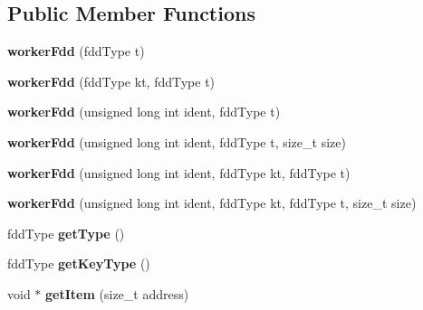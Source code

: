 \subsection*{Public Member Functions}
\begin{DoxyCompactItemize}
\item 
\hypertarget{classfaster_1_1workerFdd_a93ad6099e1b600358729aa45952c6ac9}{}{\bfseries worker\+Fdd} (fdd\+Type t)\label{classfaster_1_1workerFdd_a93ad6099e1b600358729aa45952c6ac9}

\item 
\hypertarget{classfaster_1_1workerFdd_aa07a10094bc1f054d2bb5fe89f3c2379}{}{\bfseries worker\+Fdd} (fdd\+Type kt, fdd\+Type t)\label{classfaster_1_1workerFdd_aa07a10094bc1f054d2bb5fe89f3c2379}

\item 
\hypertarget{classfaster_1_1workerFdd_a4d9f824ec396f44f4876f39f665c719b}{}{\bfseries worker\+Fdd} (unsigned long int ident, fdd\+Type t)\label{classfaster_1_1workerFdd_a4d9f824ec396f44f4876f39f665c719b}

\item 
\hypertarget{classfaster_1_1workerFdd_a592fd4bca2d66794987a8084c80e3248}{}{\bfseries worker\+Fdd} (unsigned long int ident, fdd\+Type t, size\+\_\+t size)\label{classfaster_1_1workerFdd_a592fd4bca2d66794987a8084c80e3248}

\item 
\hypertarget{classfaster_1_1workerFdd_af9f296569b13b1c548658eb083c86104}{}{\bfseries worker\+Fdd} (unsigned long int ident, fdd\+Type kt, fdd\+Type t)\label{classfaster_1_1workerFdd_af9f296569b13b1c548658eb083c86104}

\item 
\hypertarget{classfaster_1_1workerFdd_afc006b52499d50841f0a0aedd19331b3}{}{\bfseries worker\+Fdd} (unsigned long int ident, fdd\+Type kt, fdd\+Type t, size\+\_\+t size)\label{classfaster_1_1workerFdd_afc006b52499d50841f0a0aedd19331b3}

\item 
\hypertarget{classfaster_1_1workerFdd_ad994411caadedc41999bfc357dc96663}{}fdd\+Type {\bfseries get\+Type} ()\label{classfaster_1_1workerFdd_ad994411caadedc41999bfc357dc96663}

\item 
\hypertarget{classfaster_1_1workerFdd_a1f6f0608cd46a0f2ad53daa6ef3e9284}{}fdd\+Type {\bfseries get\+Key\+Type} ()\label{classfaster_1_1workerFdd_a1f6f0608cd46a0f2ad53daa6ef3e9284}

\item 
\hypertarget{classfaster_1_1workerFdd_a8794c182b3d3da254dabf54d0f9ce490}{}void $\ast$ {\bfseries get\+Item} (size\+\_\+t address)\label{classfaster_1_1workerFdd_a8794c182b3d3da254dabf54d0f9ce490}


\end{DoxyCompactItemize}
